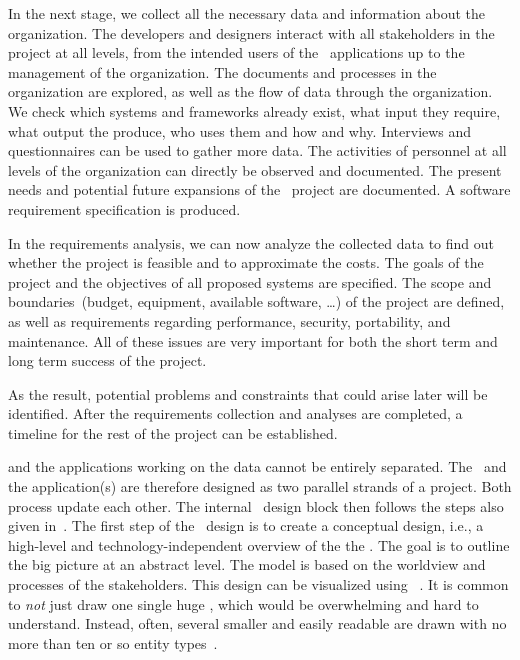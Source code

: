 In the next stage, we collect all the necessary data and information about the organization.
The developers and designers interact with all stakeholders in the project at all levels, from the intended users of the \db\ applications up to the management of the organization.
The documents and processes in the organization are explored, as well as the flow of data through the organization.
We check which systems and frameworks already exist, what input they require, what output the produce, who uses them and how and why.
Interviews and questionnaires can be used to gather more data.
The activities of personnel at all levels of the organization can directly be observed and documented.
The present needs and potential future expansions of the \db\ project are documented.
A software requirement specification is produced.

In the requirements analysis, we can now analyze the collected data to find out whether the project is feasible and to approximate the costs.
The goals of the project and the objectives of all proposed systems are specified.
The scope and boundaries~(budget, equipment, available software, \dots) of the project are defined, as well as requirements regarding performance, security, portability, and maintenance.
All of these issues are very important for both the short term and long term success of the project.

As the result, potential problems and constraints that could arise later will be identified.
After the requirements collection and analyses are completed, a timeline for the rest of the project can be established.

 and the applications working on the data cannot be entirely separated.
The \db\ and the application(s) are therefore designed as two parallel strands of a project.
Both process update each other.
The internal \db\ design block then follows the steps also given in~\cite{EN2015FODS}.
The first step of the \db\ design is to create a conceptual design, i.e., a high-level and technology-independent overview of the the \db.
The goal is to outline the big picture at an abstract level.
The model is based on the worldview and processes of the stakeholders.
This design can be visualized using ~\cite{WF1995DHQDM,B1990CMERMO}.
It is common to \emph{not} just draw one single huge , which would be overwhelming and hard to understand.
Instead, often, several smaller and easily readable  are drawn with no more than ten or so entity types~\cite{WF1995DHQDM}.

